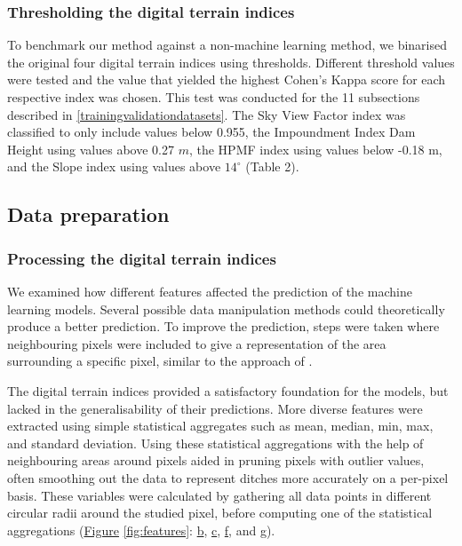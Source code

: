 \documentclass[11pt, review]{elsarticle} %
\begin{document}
\subsubsection{Thresholding the digital terrain indices}
To benchmark our method against a non-machine learning method, we binarised the original four digital terrain indices using thresholds. Different threshold values were tested and the value that yielded the highest Cohen's Kappa score for each respective index was chosen. This test was conducted for the 11 subsections described in \ref{trainingvalidationdatasets}. The Sky View Factor index was classified to only include values below 0.955, the Impoundment Index Dam Height using values above 0.27 $m$, the HPMF index using values below -0.18 m, and the Slope index using values above $14 ^{\circ}$ (Table 2). 

\subsection{Data preparation}

\subsubsection{Processing the digital terrain indices}
We examined how different  features affected the prediction of the machine learning models. Several possible data manipulation methods could theoretically produce a better prediction. To improve the prediction, steps were taken where neighbouring pixels were included to give a representation of the area surrounding a specific pixel, similar to the approach of \citet{roelens}. 

The digital terrain indices provided a satisfactory foundation for the models, but lacked in the generalisability of their predictions. More diverse features were extracted using simple statistical aggregates such as mean, median, min, max, and standard deviation. Using these statistical aggregations with the help of neighbouring areas around pixels aided in pruning pixels with outlier values, often smoothing out the data to represent ditches more accurately on a per-pixel basis. These variables were calculated by gathering all data points in different circular radii around the studied pixel, before computing one of the statistical aggregations (\hyperref[fig:features]{Figure} \ref{fig:features}: \hyperref[fig:features]{b}, \hyperref[fig:features]{c}, \hyperref[fig:features]{f}, and \hyperref[fig:features]{g}).
\end{document}

